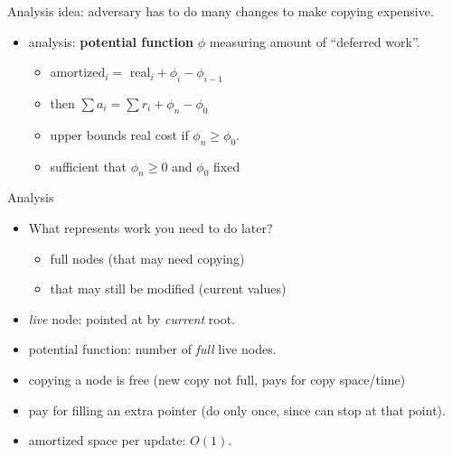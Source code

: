 \documentclass{article}
\begin{document}
Analysis idea: adversary has to do many changes to make copying expensive.
\begin{itemize}
\item analysis: \textbf{potential function} $\phi$ measuring amount of
  ``deferred work''.
\begin{itemize}
\item amortized$_i=$ real$_i+\phi_i-\phi_{i-1}$
\item then $\sum a_i=\sum r_i+\phi_n-\phi_0$
\item upper bounds real cost if $\phi_n \ge \phi_0$.
\item sufficient that $\phi_n \ge 0$ and $\phi_0$ fixed
\end{itemize}
\end{itemize}

Analysis
\begin{itemize}
\item What represents work you need to do later?
  \begin{itemize}
  \item full nodes (that may need copying)
  \item that may still be modified (current values)
  \end{itemize}
\item \emph{live} node: pointed at by \emph{current} root.
\item potential function: number of \emph{full} live nodes.
\item copying a node is free (new copy not full, pays for copy
  space/time)
\item pay for filling an extra pointer (do only once, since can stop
  at that point).
\item amortized space per update: $O(1)$.
\end{itemize}
\end{document}
